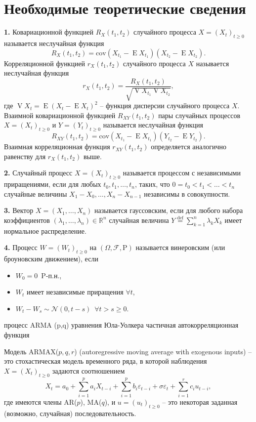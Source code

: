 \documentclass[a4paper,14pt]{extreport}
\renewcommand{\=}[1]{\stackrel{#1}{=}} %
\newcommand{\Expect}{\mathop{{}\mathrm{E}}}
\newcommand{\Proba}{\mathrm{P}}
\newcommand{\Var}{\mathop{{}\mathrm{V}}}
\newcommand{\generaltime}{t \geqslant 0}
\newcommand{\newprocess}[1]{
	\ensuremath{
		#1 = \left(#1 _t\right)_{\generaltime}
	}
}
\begin{document}
\newpage

\section*{Необходимые теоретические сведения}

\textbf{1.} Ковариационной функцией $R_X(t_1, t_2)$ случайного процесса
$\newprocess{X}$ называется неслучайная функция
\[
R_X(t_1, t_2) = \mathrm{cov} (X_{t_1} - \Expect X_{t_1}) (X_{t_2} - \Expect X_{t_2}).
\]
Корреляционной функцией $r_X(t_1, t_2)$ случайного процесса $X$ 
называется неслучайная функция 
\[
r_X(t_1, t_2) = \frac{R_X(t_1, t_2)}{\sqrt{\Var X_{t_1} \Var X_{t_2}}},
\]
где $\Var X_t = \Expect (X_t - \Expect X_t)^2$ -- функция дисперсии
случайного процесса $X$.
Взаимной ковариационной функцией $R_{XY}(t_1, t_2)$ пары 
случайных процессов $\newprocess{X}$ и $\newprocess{Y}$
называется неслучайная функция 
\[
R_{XY}(t_1, t_2) = \mathrm{cov} (X_{t_1} - \Expect X_{t_1}) (Y_{t_2} - \Expect Y_{t_2}).
\]
Взаимная корреляционная функция $r_{XY}(t_1, t_2)$ определяется
аналогично равенству для $r_X(t_1, t_2)$ выше.

\textbf{2.} Случайный процесс $\newprocess{X}$ называется процессом
с независимыми приращениями, если для любых $t_0, t_1, \ldots, t_n$,
таких, что $0 = t_0 < t_1 < \ldots < t_n$ случайные величины
$X_1 - X_0, \ldots, X_{n} - X_{n-1}$ независимы в совокупности.

\textbf{3.} Вектор $X = (X_1, \dots, X_n)$ называется
гауссовским, если для любого набора коэффициентов
$(\lambda_1, \dots, \lambda_n) \in \mathbb{R}^n$
случайная величина $Y \stackrel{\text{def}}{=}
\sum_{k=1}^n \lambda_k X_k$ имеет нормальное распределение. 

\textbf{4.} Процесс $\newprocess{W}$ на $(\Omega, \mathcal{F}, \Proba)$
называется винеровским (или броуновским движением), если 
\begin{itemize}
    \item $W_0 = 0 \,\,\, \Proba$-п.н.,
    \item $W_t$ имеет независимые приращения $\forall t$,
    \item $W_t - W_s \sim \mathcal{N}(0, t- s) \,\,\, \forall t > s \ge 0$.
\end{itemize}


процесс ARMA (p,q)
уравнения Юла-Уолкера
частичная автокорреляционная функция

Модель ARMAX($p, q, r$) (autoregressive moving average with exogenous inputs) -- 
это стохастическая модель временного ряда, в которой наблюдения $\newprocess{X}$
задаются соотношением
\[
X_t = a_0 + \sum\limits_{i=1}^p a_i X_{t-i} 
	+ \sum\limits_{i=1}^p b_i \varepsilon_{t-i} + \sigma \varepsilon_t
	+ \sum\limits_{i=1}^r c_i u_{t-i},
\]
где имеются члены AR($p$), MA($q$), и
$\newprocess{u}$ -- это некоторая заданная (возможно, случайная)
последовательность.
\end{document}
